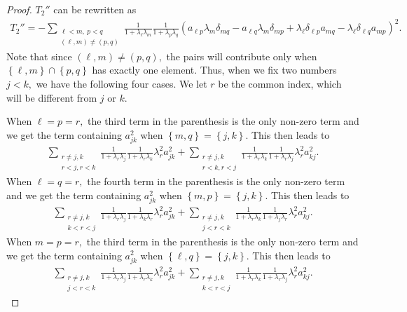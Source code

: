 \documentclass[10pt,a4paper]{amsart}
\newcommand{\pr}[1]{\left(#1\right)}
\newcommand{\set}[1]{\left\{#1\right\}}
\begin{document}
\begin{proof}
	
	$T_2''$ can be rewritten as
	\begin{align*}
	T_2''
	=
	-\sum_{\substack{\ell<m,\ p<q\\(\ell,m)\neq (p,q)}}
	\frac 1{1+\lambda_\ell\lambda_m}
	\frac 1{1+\lambda_p\lambda_q}
	\pr{
		a_{\ell p}\lambda_m\delta_{mq}
		- a_{\ell q}\lambda_m\delta_{mp}
		+ \lambda_\ell\delta_{\ell p}a_{mq}
		- \lambda_\ell\delta_{\ell q}a_{mp}
	}^2.	
	\end{align*}
	Note that since $(\ell,m)\neq (p,q),$ the pairs will contribute only when $\set{\ell,m}\cap \set{p,q}$ has exactly one element.
	Thus, when we fix two numbers $j<k,$ we have the following four cases.
	We let $r$ be the common index, which will be different from $j$ or $k.$
	
	When $\ell=p=r,$ the third term in the parenthesis is the only non-zero term and we get the term containing $a_{jk}^2$ when $\set{m,q}=\set{j,k}.$
	This then leads to
	\begin{align}\label{T2-1}
	\sum_{\substack{r\neq j,k\\r<j,r<k}}
	\frac 1{1+\lambda_r\lambda_j}
	\frac 1{1+\lambda_r\lambda_k}
	\lambda_r^2 a_{jk}^2
	+ \sum_{\substack{r\neq j,k\\r<k,r<j}}
	\frac 1{1+\lambda_r\lambda_k}
	\frac 1{1+\lambda_r\lambda_j}
	\lambda_r^2 a_{kj}^2.
	\end{align}
	When $\ell=q=r,$ the fourth term in the parenthesis is the only non-zero term and we get the term containing $a_{jk}^2$ when $\set{m,p}=\set{j,k}.$
	This then leads to
	\begin{align}\label{T2-2}
	\sum_{\substack{r\neq j,k\\k<r<j}}
	\frac 1{1+\lambda_r\lambda_j}
	\frac 1{1+\lambda_k\lambda_r}
	\lambda_r^2 a_{jk}^2
	+ \sum_{\substack{r\neq j,k\\j<r<k}}
	\frac 1{1+\lambda_r\lambda_k}
	\frac 1{1+\lambda_j\lambda_r}
	\lambda_r^2 a_{kj}^2.
	\end{align}
	When $m=p=r,$ the third term in the parenthesis is the only non-zero term and we get the term containing $a_{jk}^2$ when $\set{\ell,q}=\set{j,k}.$
	This then leads to
	\begin{align}\label{T2-3}
	\sum_{\substack{r\neq j,k\\j<r<k}}
	\frac 1{1+\lambda_r\lambda_j}
	\frac 1{1+\lambda_r\lambda_k}
	\lambda_r^2 a_{jk}^2
	+ \sum_{\substack{r\neq j,k\\k<r<j}}
	\frac 1{1+\lambda_r\lambda_k}
	\frac 1{1+\lambda_r\lambda_j}
	\lambda_r^2 a_{kj}^2.
	\end{align}

\end{proof}
\end{document}
